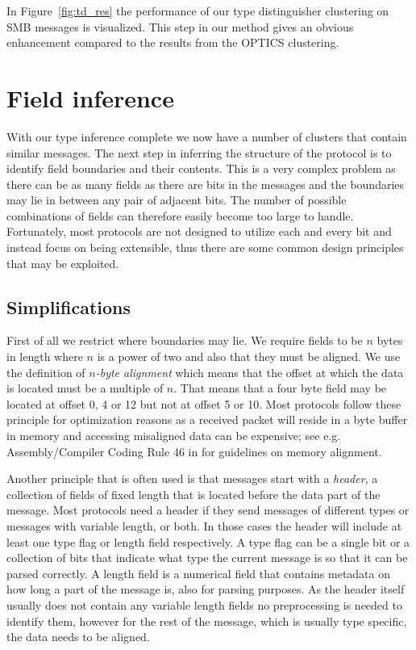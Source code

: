 \documentclass[a4paper]{report}
\begin{document}
In Figure~\ref{fig:td_res} the performance of our type distinguisher clustering
on SMB messages is visualized. This step in our method gives an obvious
enhancement compared to the results from the OPTICS clustering.

\section{Field inference}
\label{sec:field_inf}
With our type inference complete we now have a number of clusters that contain
similar messages. The next step in inferring the structure of the protocol is
to identify field boundaries and their contents. This is a very complex
problem as there can be as many fields as there are bits in the messages and
the boundaries may lie in between any pair of adjacent bits. The number of
possible combinations of fields can therefore easily become too large to
handle. Fortunately, most protocols are not designed to utilize each and every
bit and instead focus on being extensible, thus there are some common design
principles that may be exploited.

\subsection{Simplifications}
\label{sec:simplifications}
First of all we restrict where boundaries may lie. We require fields to be $n$
bytes in length where $n$ is a power of two and also that they must be aligned.
We use the definition of \emph{$n$-byte alignment} which means that the offset
at which the data is located must be a multiple of $n$. That means that a four
byte field may be located at offset 0, 4 or 12 but not at offset 5 or 10. Most
protocols follow these principle for optimization reasons as a received packet
will reside in a byte buffer in memory and accessing misaligned data can be
expensive; see e.g. Assembly/Compiler Coding Rule 46 in 
for guidelines on memory alignment.

Another principle that is often used is that messages start with a
\emph{header}, a collection of fields of fixed length that is located before
the data part of the message. Most protocols need a header if they send
messages of different types or messages with variable length, or both. In those
cases the header will include at least one type flag or length field
respectively. A type flag can be a single bit or a collection of bits that
indicate what type the current message is so that it can be parsed correctly. A
length field is a numerical field that contains metadata on how long a part of
the message is, also for parsing purposes. As the header itself usually does
not contain any variable length fields no preprocessing is needed to identify
them, however for the rest of the message, which is usually type specific, the
data needs to be aligned.
\end{document}
